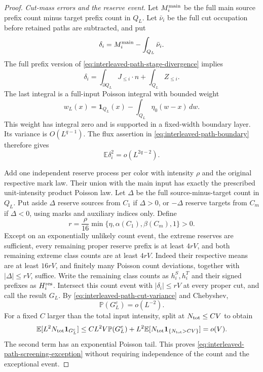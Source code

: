 \documentclass[11pt,reqno]{amsart}
\theoremstyle{definition}
\theoremstyle{remark}
\numberwithin{equation}{section}
\newcommand{\E}{\mathbb E}
\newcommand{\Pp}{\mathbb P}
\begin{document}
\begin{proof}
\emph{Cut-mass errors and the reserve event.}
Let $M_i^{\rm main}$ be the full main source prefix count minus target
prefix count in $Q_L$. Let $\bar\nu_i$ be the full cut occupation
before retained paths are subtracted, and put
\[
             \delta_i=M_i^{\rm main}-\int_{Q_L}\bar\nu_i.
\]
The full prefix version of
\eqref{eq:interleaved-path-stage-divergence} implies
\begin{equation}
 \delta_i=\int_{\partial Q_L}J_{\le i}\cdot n
                              +\int_{Q_L}Z_{\le i}.
 \label{eq:interleaved-path-cut-error}
\end{equation}
The last integral is a full-input Poisson integral with bounded weight
\[
 w_L(x)=\mathbf1_{Q_L}(x)-\int_{Q_L}\eta_0(w-x)\,dw.
\]
This weight has integral zero and is supported in a fixed-width boundary
layer. Its variance is $O(L^{q-1})$. The flux assertion in
\eqref{eq:interleaved-path-boundary} therefore gives
\begin{equation}
                  \E\delta_i^2=o(L^{2q-2}).
 \label{eq:interleaved-path-cut-variance}
\end{equation}

Add one independent reserve process per color with intensity $\rho$
and the original respective mark law. Their union with the main input
has exactly the prescribed unit-intensity product Poisson law.
Let $\Delta$ be the full source-minus-target count in $Q_L$. Put aside
$\Delta$ reserve sources from $C_1$ if $\Delta>0$, or $-\Delta$
reserve targets from $C_m$ if $\Delta<0$, using marks and auxiliary
indices only. Define
\[
 r=\frac{\rho}{16}
        \min\{\eta,\alpha(C_1),\beta(C_m),1\}>0.
\]
Except on an exponentially unlikely count event, the extreme reserves
are sufficient, every remaining proper reserve prefix is at least
$4rV$, and both remaining extreme class counts are at least $4rV$.
Indeed their respective means are at least $16rV$, and finitely many
Poisson count deviations, together with $|\Delta|\le rV$, suffice.
Write the remaining class counts as $h_i^S,h_i^T$ and their signed
prefixes as $H_i^{\rm res}$.
Intersect this count event with $|\delta_i|\le rV$ at every proper
cut, and call the result $G_L$. By
\eqref{eq:interleaved-path-cut-variance} and Chebyshev,
\[
                         \Pp(G_L^c)=o(L^{-2}).
\]
For a fixed $C$ larger than the total input intensity, split at
$N_{\rm tot}\le CV$ to obtain
\[
 \E[L^2N_{\rm tot}\mathbf1_{G_L^c}]
 \le CL^2V\Pp(G_L^c)
       +L^2\E[N_{\rm tot}\mathbf1_{\{N_{\rm tot}>CV\}}]
 =o(V).
\]
The second term has an exponential Poisson tail. This proves
\eqref{eq:interleaved-path-screening-exception} without requiring
independence of the count and the exceptional event.


\end{proof}
\end{document}
